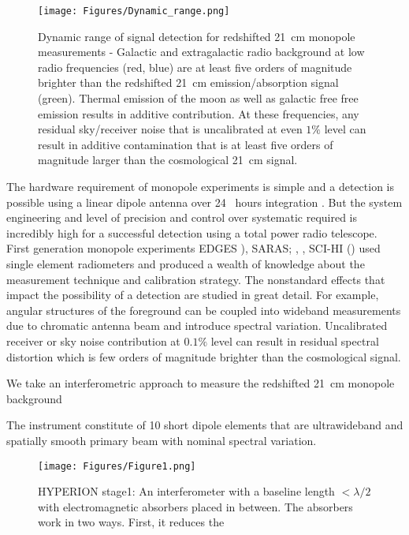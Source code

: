 \documentclass[12pt]{amsart}
\begin{document}
\begin{figure}[!ht]
\centering
\texttt{[image: Figures/Dynamic\_range.png]}
\caption{\small
Dynamic range of signal detection for redshifted 21~cm monopole measurements - Galactic and extragalactic radio background at low radio frequencies (red, blue) are at least five orders of magnitude brighter than the redshifted 21~cm emission/absorption signal (green). Thermal emission of the moon as well as galactic free free emission results in additive contribution. At these frequencies, any residual sky/receiver noise that is uncalibrated at even $1\%$ level can result in additive contamination that is at least five orders of magnitude larger than the cosmological 21~cm signal.
}
\label{figure2}
\end{figure}
The hardware requirement of monopole experiments is simple and a detection is possible using a linear dipole antenna over 24 ~hours integration \cite{Shaver99}. But the system engineering and level of precision and
control over systematic required is incredibly high for a successful detection using a total power radio telescope.
First generation monopole experiments EDGES \cite{Bowman_Roger2010}), SARAS; \cite{Patra13}, \cite{Patra15b} , SCI-HI (\cite{Voytek2015}) used single element radiometers and produced a wealth of knowledge about the measurement technique and calibration strategy. The nonstandard effects that impact the possibility of a detection are studied in great detail. For example, angular structures of the foreground can be coupled into wideband measurements due to chromatic antenna beam and introduce spectral variation. Uncalibrated receiver or sky noise contribution at $0.1\%$ level can result in residual spectral distortion which is few orders of magnitude brighter than the cosmological signal. 

We take an interferometric approach to measure the redshifted 21~cm monopole background

The instrument constitute of 10 short dipole elements that are ultrawideband and spatially smooth primary beam with nominal spectral variation.

\begin{figure}[!ht]
\centering
\texttt{[image: Figures/Figure1.png]}
 \caption{\small
HYPERION stage1: An interferometer with a baseline length $< \lambda/2$ with electromagnetic absorbers placed in between. The absorbers work in two ways. First, it reduces the 
}
\label{figure3}
\end{figure}
\end{document}
